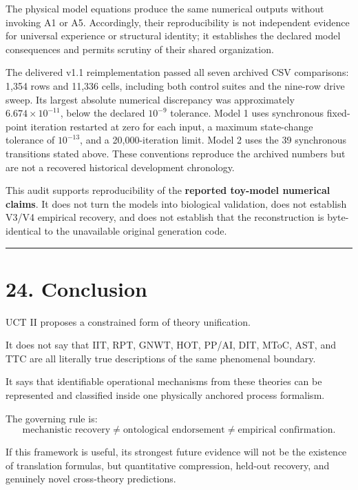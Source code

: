 \documentclass[
  11pt,
  a4paper,
]{article}
\begin{document}
The physical model equations produce the same numerical outputs without
invoking A1 or A5. Accordingly, their reproducibility is not independent
evidence for universal experience or structural identity; it establishes
the declared model consequences and permits scrutiny of their shared
organization.

The delivered v1.1 reimplementation passed all seven archived CSV
comparisons: 1,354 rows and 11,336 cells, including both control suites
and the nine-row drive sweep. Its largest absolute numerical discrepancy
was approximately \(6.674\times10^{-11}\), below the declared
\(10^{-9}\) tolerance. Model 1 uses synchronous fixed-point iteration
restarted at zero for each input, a maximum state-change tolerance of
\(10^{-13}\), and a 20,000-iteration limit. Model 2 uses the 39
synchronous transitions stated above. These conventions reproduce the
archived numbers but are not a recovered historical development
chronology.

This audit supports reproducibility of the \textbf{reported toy-model
numerical claims}. It does not turn the models into biological
validation, does not establish V3/V4 empirical recovery, and does not
establish that the reconstruction is byte-identical to the unavailable
original generation code.

\begin{center}\rule{0.5\linewidth}{0.5pt}\end{center}

\hypertarget{conclusion}{%
\section{24. Conclusion}\label{conclusion}}

UCT II proposes a constrained form of theory unification.

It does not say that IIT, RPT, GNWT, HOT, PP/AI, DIT, MToC, AST, and TTC
are all literally true descriptions of the same phenomenal boundary.

It says that identifiable operational mechanisms from these theories can
be represented and classified inside one physically anchored process
formalism.

The governing rule is:
\nopagebreak[4]
\[
\boxed{
\text{mechanistic recovery}
\neq
\text{ontological endorsement}
\neq
\text{empirical confirmation}.
}
\]

If this framework is useful, its strongest future evidence will not be
the existence of translation formulas, but quantitative compression,
held-out recovery, and genuinely novel cross-theory predictions.
\end{document}
